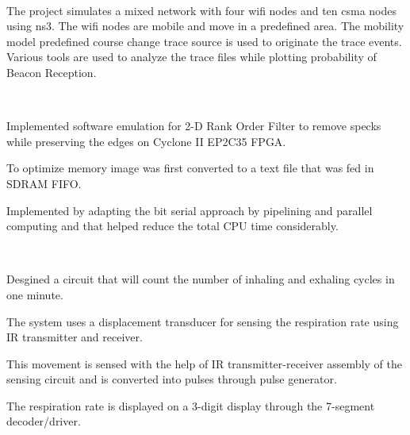\documentclass[letterpaper]{deedy-resume} %
\begin{document}
\begin{minipage}[t]{0.66\textwidth}
 \\
\begin{tightitemize}
\item The project simulates a mixed network with four wifi nodes and ten csma nodes using ns3. The wifi nodes are mobile and move in a predefined area. The mobility model predefined course change trace source is used to originate the trace events. Various tools are used to analyze the trace files while plotting probability of Beacon Reception.
\end{tightitemize}

\sectionspace %


 \\

\vspace{\topsep} %
\begin{tightitemize}
\item Implemented software emulation for 2-D Rank Order Filter to remove specks while preserving the edges on Cyclone II EP2C35 FPGA.
\item To optimize memory image was first converted to a text file that was fed in SDRAM FIFO.
\item Implemented by adapting the bit serial approach by pipelining and parallel computing and that helped reduce the total CPU time considerably.
\end{tightitemize}

\sectionspace %


 \\
\begin{tightitemize}
\item Desgined a circuit that will count the number of inhaling and exhaling cycles in one minute.
\item The system uses a displacement transducer for sensing the respiration rate using IR transmitter and receiver.
\item This movement is sensed with the help of IR transmitter-receiver assembly of the sensing circuit and is converted into pulses through pulse generator. 
\item The respiration rate is displayed on a 3-digit display through the 7-segment decoder/driver.
\end{tightitemize}


\end{minipage}
\end{document}
